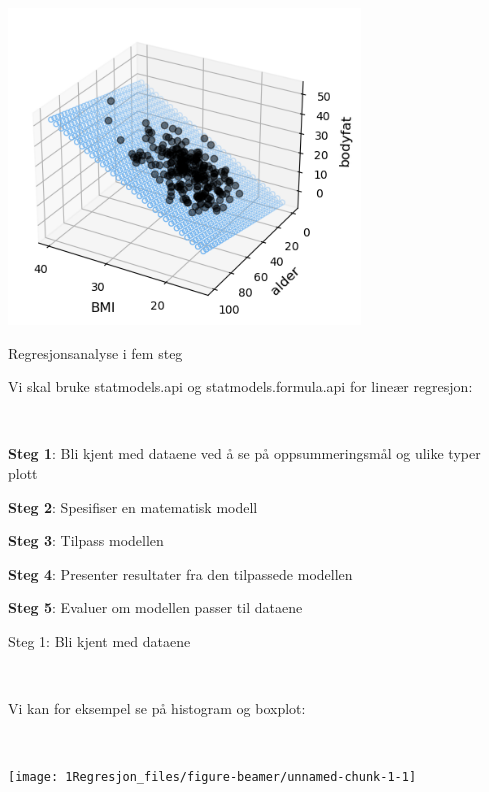 \documentclass[10pt,ignorenonframetext,]{beamer}
\begin{document}
\begin{frame}

\centering

\includegraphics[width=0.7\textwidth,height=\textheight]{multippelRegGraph.png}

\end{frame}

\begin{frame}{Regresjonsanalyse i fem steg}
\protect\hypertarget{regresjonsanalyse-i-fem-steg}{}

Vi skal bruke statmodels.api og statmodels.formula.api for lineær
regresjon:

\(~\)

\textbf{Steg 1}: Bli kjent med dataene ved å se på oppsummeringsmål og
ulike typer plott

\textbf{Steg 2}: Spesifiser en matematisk modell

\textbf{Steg 3}: Tilpass modellen

\textbf{Steg 4}: Presenter resultater fra den tilpassede modellen

\textbf{Steg 5}: Evaluer om modellen passer til dataene

\end{frame}

\begin{frame}

\begin{block}{Steg 1: Bli kjent med dataene}

\(~\)

Vi kan for eksempel se på histogram og boxplot:

\(~\)

\begin{center}\texttt{[image: 1Regresjon\_files/figure-beamer/unnamed-chunk-1-1]} \end{center}

\end{block}

\end{frame}
\end{document}
